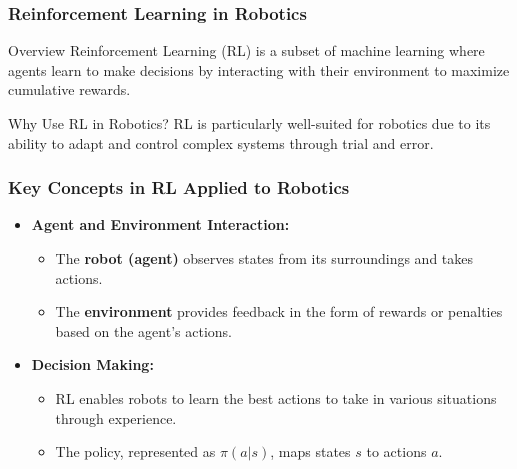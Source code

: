 \documentclass[aspectratio=169]{beamer}
\begin{document}
\begin{frame}[fragile]
    \frametitle{Reinforcement Learning in Robotics}
    \begin{block}{Overview}
        Reinforcement Learning (RL) is a subset of machine learning where agents learn to make decisions by interacting with their environment to maximize cumulative rewards. 
    \end{block}
    
    \begin{block}{Why Use RL in Robotics?}
        RL is particularly well-suited for robotics due to its ability to adapt and control complex systems through trial and error.
    \end{block}
\end{frame}

\begin{frame}[fragile]
    \frametitle{Key Concepts in RL Applied to Robotics}
    \begin{itemize}
        \item \textbf{Agent and Environment Interaction:}
        \begin{itemize}
            \item The \textbf{robot (agent)} observes states from its surroundings and takes actions.
            \item The \textbf{environment} provides feedback in the form of rewards or penalties based on the agent's actions.
        \end{itemize}
        
        \item \textbf{Decision Making:}
        \begin{itemize}
            \item RL enables robots to learn the best actions to take in various situations through experience.
            \item The policy, represented as \( \pi(a|s) \), maps states \( s \) to actions \( a \).
        \end{itemize}
    \end{itemize}
\end{frame}
\end{document}
